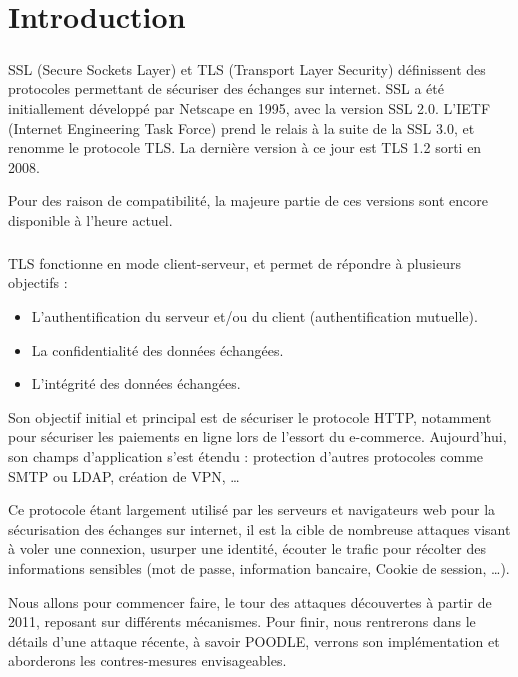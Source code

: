 \chapter*{Introduction}

\paragraph{}
SSL (Secure Sockets Layer) et TLS (Transport Layer Security) définissent des protocoles 
permettant de sécuriser des échanges sur internet. SSL a été initiallement développé 
par Netscape en 1995, avec la version SSL 2.0. L'IETF (Internet Engineering Task Force)
prend le relais à la suite de la SSL 3.0, et renomme le protocole TLS.
La dernière version à ce jour est TLS 1.2 sorti en 2008.

Pour des raison de compatibilité, la majeure partie de ces versions sont 
encore disponible à l'heure actuel.

\paragraph{}
TLS fonctionne en mode client-serveur, et permet de répondre à plusieurs objectifs :
\begin{itemize}
\item L'authentification du serveur et/ou du client (authentification mutuelle).
\item La confidentialité des données échangées.
\item L'intégrité des données échangées.\\
\end{itemize}


Son objectif initial et principal est de sécuriser le protocole HTTP, 
notamment pour sécuriser les paiements en ligne lors de l'essort du e-commerce. 
Aujourd'hui, son champs d'application s'est étendu : protection d'autres 
protocoles comme SMTP ou LDAP, création de VPN, \dots

Ce protocole étant largement utilisé par les serveurs et navigateurs web 
pour la sécurisation des échanges sur internet, 
il est la cible de nombreuse attaques visant à voler une connexion, 
usurper une identité, écouter le trafic pour récolter des informations sensibles 
(mot de passe, information bancaire, Cookie de session, \dots).

Nous allons pour commencer faire, 
le tour des attaques découvertes à partir de 2011, reposant sur différents mécanismes. 
Pour finir, nous rentrerons dans le détails d'une attaque récente, 
à savoir POODLE, verrons son implémentation et aborderons 
les contres-mesures envisageables. 


